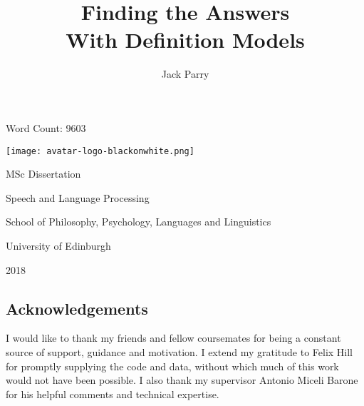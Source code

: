 \documentclass[11pt]{article}
\title{\Huge Finding the Answers \\ With Definition Models}
\date{}
\author{Jack Parry}
\begin{document}

\maketitle


\begin{center}
Word Count: 9603

\texttt{[image: avatar-logo-blackonwhite.png]}

 
\small MSc Dissertation

Speech and Language Processing

School of Philosophy, Psychology, Languages and Linguistics

University of Edinburgh

2018
\end{center}


\newpage
\normalsize
{}

\begin{center}
\section*{Acknowledgements}
I would like to thank my friends and fellow coursemates for being a constant source of support, guidance and motivation. I extend my gratitude to Felix Hill for promptly supplying the code and data, without which much of this work would not have been possible. I also thank my supervisor Antonio Miceli Barone for his helpful comments and technical expertise. 
\end{center}
\end{document}
